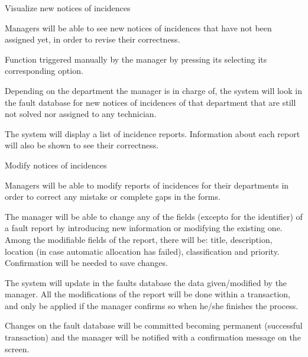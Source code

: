 
\begin{requirement}{Visualize new notices of incidences}

\reqdesc Managers will be able to see new notices of incidences that have not been assigned yet, in order to revise their correctness.

\reqin Function triggered manually by the manager by pressing its selecting its corresponding option.

\reqsteps Depending on the department the manager is in charge of, the system will look in the fault database for new notices of incidences of that department that are still not solved nor assigned to any technician.

\reqout The system will display a list of incidence reports. Information about each report will also be shown to see their correctness.

\end{requirement}


\begin{requirement}{Modify notices of incidences}

\reqdesc Managers will be able to modify reports of incidences for their departments in order to correct any mistake or complete gaps in the forms.

\reqin The manager will be able to change any of the fields (excepto for the identifier) of a fault report by introducing new information or modifying the existing one. Among the modifiable fields of the report, there will be: title, description, location (in case automatic allocation has failed), classification and priority. Confirmation will be needed to save changes.

\reqsteps The system will update in the faults database the data given/modified by the manager. All the modifications of the report will be done within a transaction, and only be applied if the manager confirms so when he/she finishes the process.

\reqout Changes on the fault database will be committed becoming permanent (successful transaction) and the manager will be notified with a confirmation message on the screen.

\end{requirement}


